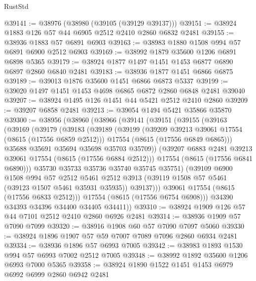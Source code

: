 \begin{lexlean}{RustStd}
\begin{coremodule}
@39141 := @38976 (@38980 (@39105 (@39129 @39137)))
@39151 := @38924 @1883 @126 @57 @44 @6905 @2512 @2410 @2860 @6832 @2481
@39155 := @38936 @1883 @57 @6891 @6903
@39163 := @38983 @1880 @1508 @994 @57 @6891 @6900 @2512 @6903
@39169 := @38992 @1879 @35600 @1206 @6891 @6898 @5365
@39179 := @38924 @1877 @1497 @1451 @1453 @6877 @6890 @6897 @2860 @6840 @2481
@39183 := @38936 @1877 @1451 @6866 @6875
@39189 := @39013 @1876 @35600 @1451 @6866 @6873 @5337
@39199 := @39020 @1497 @1451 @1453 @4698 @6865 @6872 @2860 @6848 @2481 @39040
@39207 := @38924 @1495 @126 @1451 @44 @5421 @2512 @2410 @2860
@39209 := @39207 @6858 @2481
@39213 := @39054 @1494 @5421 @35866 @35870
@39300 := @38956
    (@38960
      (@38966
        (@39141
          (@39151
            (@39155
              (@39163
                (@39169
                  (@39179
                    (@39183
                      (@39189
                        (@39199
                          (@39209 @39213 @39061 @17554 (@8615 (@17556 @6859 @2512)))
                          @17554
                          (@8615 (@17556 @6849 @6865)))
                        @35688
                        @35691
                        @35694
                        @35698
                        @35703
                        @35709))
                    (@39207 @6883 @2481 @39213 @39061 @17554 (@8615 (@17556 @6884 @2512)))
                    @17554
                    (@8615 (@17556 @6841 @6890)))
                  @35730
                  @35733
                  @35736
                  @35740
                  @35745
                  @35751)
                (@39109
                  @6900
                  @1508
                  @994
                  @57
                  @2512
                  @5461
                  @2512
                  @3913
                  (@39119 @1508 @57 @5461 (@39123 @1507 @5461 @35931 @35935))
                  @39137)))
            @39061
            @17554
            (@8615 (@17556 @6833 @2512)))
          @17554
          (@8615 (@17556 @6754 @6908)))
        @34390
        @34393
        @34396
        @34400
        @34405
        @34411))
@39310 := @38924 @1909 @126 @57 @44 @7101 @2512 @2410 @2860 @6926 @2481
@39314 := @38936 @1909 @57 @7090 @7099
@39320 := @38916 @1908 @60 @57 @7090 @7097 @5060
@39330 := @38924 @1896 @1907 @57 @59 @7007 @7089 @7096 @2860 @6934 @2481
@39334 := @38936 @1896 @57 @6993 @7005
@39342 := @38983 @1893 @1530 @994 @57 @6993 @7002 @2512 @7005
@39348 := @38992 @1892 @35600 @1206 @6993 @7000 @5365
@39358 := @38924 @1890 @1522 @1451 @1453 @6979 @6992 @6999 @2860 @6942 @2481

\end{coremodule}
\end{lexlean}
